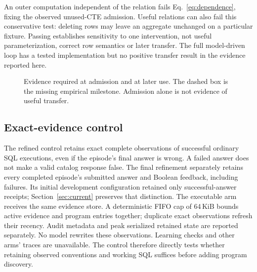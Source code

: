 \documentclass[10pt,twocolumn]{article}
\begin{document}
An outer computation independent of the relation fails
Eq.~\eqref{eq:dependence}, fixing the observed unused-CTE admission. Useful
relations can also fail this conservative test: deleting rows may leave an
aggregate unchanged on a particular fixture. Passing establishes sensitivity to
one intervention, not useful parameterization, correct row semantics or later
transfer. The full model-driven loop has a tested implementation but no positive
transfer result in the evidence reported here.

\begin{figure}[t]
\centering
{}
\caption{Evidence required at admission and at later use. The dashed box is the
missing empirical milestone. Admission alone is not evidence of useful transfer.}
\label{fig:loop}
\end{figure}

\subsection{Exact-evidence control}
The refined control retains exact complete observations of successful ordinary
SQL executions, even if the episode's final answer is wrong. A failed answer
does not make a valid catalog response false. The final refinement separately
retains every completed episode's submitted answer and Boolean feedback,
including failures. Its initial development configuration retained only
successful-answer receipts; Section~\ref{sec:current} preserves that distinction.
The executable arm receives the same evidence store. A deterministic FIFO cap
of 64\,KiB bounds active evidence and program entries together; duplicate exact
observations refresh their recency. Audit metadata and peak serialized retained
state are reported separately. No model rewrites these observations. Learning checks and other arms'
traces are unavailable. The control therefore directly tests whether retaining
observed conventions and working SQL suffices before adding program discovery.
\end{document}
